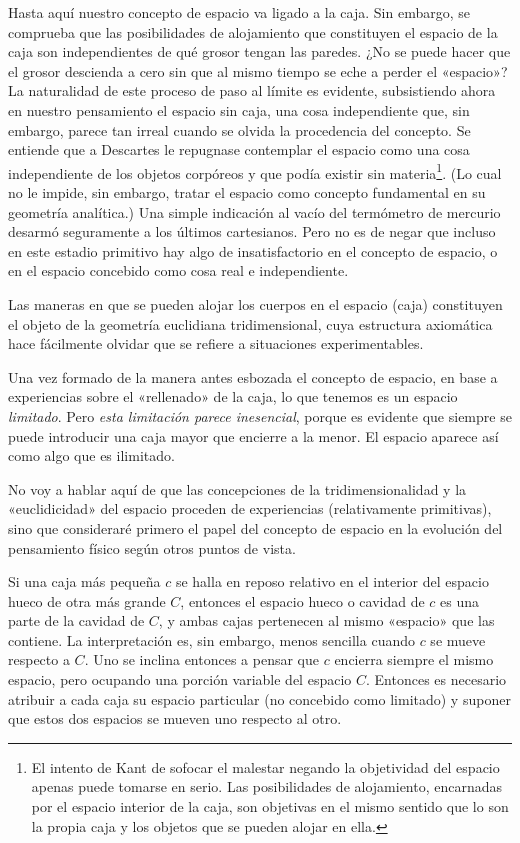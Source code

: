\documentclass[spanish]{book}
\begin{document}
Hasta aquí nuestro concepto de espacio va ligado a la caja. Sin embargo, se
comprueba que las posibilidades de alojamiento que constituyen el espacio de la caja
son independientes de qué grosor tengan las paredes. ¿No se puede hacer que el grosor
descienda a cero sin que al mismo tiempo se eche a perder el «espacio»? La naturalidad
de este proceso de paso al límite es evidente, subsistiendo ahora en nuestro
pensamiento el espacio sin caja, una cosa independiente que, sin embargo, parece tan
irreal cuando se olvida la procedencia del concepto. Se entiende que a Descartes le
repugnase contemplar el espacio como una cosa independiente de los objetos
corpóreos y que podía existir sin materia\footnote{El intento de Kant de sofocar el 
malestar negando la objetividad del espacio 
apenas puede tomarse en serio. Las posibilidades de alojamiento, encarnadas por el espacio
interior de la caja, son objetivas en el mismo sentido que lo son la propia caja y los objetos
que se pueden alojar en ella.}. (Lo cual no le impide, sin embargo, tratar el
espacio como concepto fundamental en su geometría analítica.) Una simple indicación
al vacío del termómetro de mercurio desarmó seguramente a los últimos cartesianos.
Pero no es de negar que incluso en este estadio primitivo hay algo de insatisfactorio en
el concepto de espacio, o en el espacio concebido como cosa real e independiente.

Las maneras en que se pueden alojar los cuerpos en el espacio (caja) constituyen el
objeto de la geometría euclidiana tridimensional, cuya estructura axiomática hace
fácilmente olvidar que se refiere a situaciones experimentables.

Una vez formado de la manera antes esbozada el concepto de espacio, en base a
experiencias sobre el «rellenado» de la caja, lo que tenemos es un espacio \textit{limitado}.
Pero \textit{esta limitación parece inesencial}, porque es evidente que siempre se puede introducir
una caja mayor que encierre a la menor. El espacio aparece así como algo que es
ilimitado.

No voy a hablar aquí de que las concepciones de la tridimensionalidad y la
«euclidicidad» del espacio proceden de experiencias (relativamente primitivas), sino
que consideraré primero el papel del concepto de espacio en la evolución del
pensamiento físico según otros puntos de vista.

Si una caja más pequeña $c$ se halla en reposo relativo en el interior del espacio hueco
de otra más grande $C$, entonces el espacio hueco o cavidad de $c$ es una parte de la
cavidad de $C$, y ambas cajas pertenecen al mismo «espacio» que las contiene. La
interpretación es, sin embargo, menos sencilla cuando $c$ se mueve respecto a $C$. Uno se
inclina entonces a pensar que $c$ encierra siempre el mismo espacio, pero ocupando una
porción variable del espacio $C$. Entonces es necesario atribuir a cada caja su espacio
particular (no concebido como limitado) y suponer que estos dos espacios se mueven
uno respecto al otro.
\end{document}
